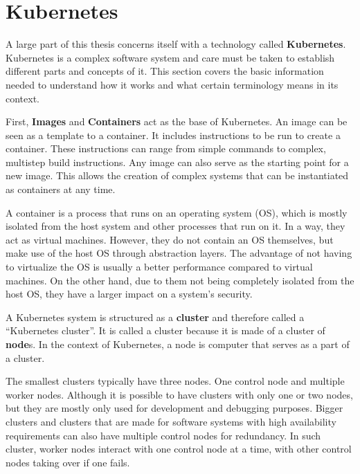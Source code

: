 \section{Kubernetes}\label{sec:kubernetes}

A large part of this thesis concerns itself with a technology called \textbf{Kubernetes}.
Kubernetes is a complex software system and care must be taken to establish different parts and concepts of it.
This section covers the basic information needed to understand how it works and what certain terminology means in its context.

First, \textbf{Images} and \textbf{Containers}\cite{docker-image,kubernetes-images,kubernetes-containers} act as the base of Kubernetes.
An image can be seen as a template to a container.
It includes instructions to be run to create a container.
These instructions can range from simple commands to complex, multistep build instructions.
Any image can also serve as the starting point for a new image.
This allows the creation of complex systems that can be instantiated as containers at any time.

A container\cite{what-are-linux-containers} is a process that runs on an operating system (OS), which is mostly isolated from the host system and other processes that run on it.
In a way, they act as virtual machines.
However, they do not contain an OS themselves, but make use of the host OS through abstraction layers.
The advantage of not having to virtualize the OS is usually a better performance compared to virtual machines.
On the other hand, due to them not being completely isolated from the host OS, they have a larger impact on a system's security.

A Kubernetes system is structured as a \textbf{cluster} and therefore called a ``Kubernetes cluster''\cite{kubernetes-cluster}.
It is called a cluster because it is made of a cluster of \textbf{node}s.
In the context of Kubernetes, a node is computer that serves as a part of a cluster.

The smallest clusters typically have three nodes\cite{kubernetes-cluster}.
One control node and multiple worker nodes.
Although it is possible to have clusters with only one or two nodes, but they are mostly only used for development and debugging purposes\cite{minikube}.
Bigger clusters and clusters that are made for software systems with high availability requirements can also have multiple control nodes for redundancy.
In such cluster, worker nodes interact with one control node at a time, with other control nodes taking over if one fails.

